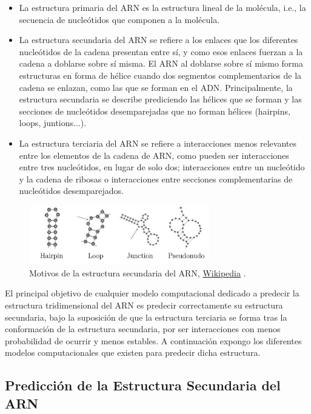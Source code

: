 \documentclass[a4paper,11pt,titlepage]{article}
\theoremstyle{definition}
\begin{document}
\begin{itemize}
    \item La estructura primaria del ARN es la estructura lineal de la molécula, i.e., la secuencia de nucleótidos que componen a la molécula.
    \item La estructura secundaria del ARN se refiere a los enlaces que los diferentes nucleótidos de la cadena presentan entre sí, y como esos enlaces fuerzan a la cadena a doblarse sobre sí misma. El ARN al doblarse sobre sí mismo forma estructuras en forma de hélice cuando dos segmentos complementarios de la cadena se enlazan, como las que se forman en el ADN. Principalmente, la estructura secundaria se describe prediciendo las hélices que se forman y las secciones de nucleótidos desemparejadas que no forman hélices (hairpins, loops, juntions...).
    \item La estructura terciaria del ARN se refiere a interacciones menos relevantes entre los elementos de la cadena de ARN, como pueden ser interacciones entre tres nucleótidos, en lugar de solo dos; interacciones entre un nucleótido y la cadena de ribosas o interacciones entre secciones complementarias de nucleótidos desemparejados.
\end{itemize}

\begin{figure}[H]
    \centering
    \includegraphics[width=0.70\textwidth]{images/RNA_secondary_structure.png}
    \small{\caption{Motivos de la estructura secundaria del ARN, \href{https://es.wikipedia.org/wiki/acido_ribonucleico}{Wikipedia} \cite{rnawiki}.}\label{fig:RNA_secondary_structure}}\normalsize
\end{figure}

El principal objetivo de cualquier modelo computacional dedicado a predecir la estructura tridimensional del ARN es predecir correctamente su estructura secundaria, bajo la suposición de que la estructura terciaria se forma tras la conformación de la estructura secundaria, por ser interacciones con menos probabilidad de ocurrir y menos estables. A continuación expongo los diferentes modelos computacionales que existen para predecir dicha estructura.

\subsection{Predicción de la Estructura Secundaria del ARN}\label{subsubsec:thbasis}
\end{document}
